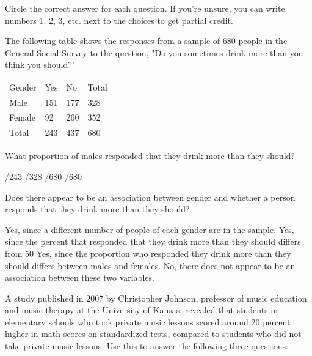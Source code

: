 \documentclass{article}
\begin{document}
	Circle the correct answer for each question.  If you're unsure, you can write numbers 1, 2, 3, etc. next to the choices to get partial credit.\\[.5cm]
	
	\begin{mcquestions}
		\begin{mcquestioninstruction}
			The following table shows the responses from a sample of 680 people in the General Social Survey to the question, "Do you sometimes drink more than you think you should?"\\
			
			\begin{tabular}{llll}
				Gender & Yes                     & No  & Total  \\
				Male   & 151                     & 177 & 328    \\
				Female & 92                      & 260 & 352    \\
				Total  & 243                     & 437 & 680   
			\end{tabular}
		\end{mcquestioninstruction}
		\question What proportion of males responded that they drink more than they should?
		\begin{mcanswerslist}
			/243
			/328
			/680
			/680
		\end{mcanswerslist}
		
		\question[follow] Does there appear to be an association between gender and whether a person responds that they drink more than they should?
		\begin{mcanswerslist}
			\answer Yes, since a different number of people of each gender are in the sample.
			\answer Yes, since the percent that responded that they drink more than they should differs from 50%
			\answer[correct] Yes, since the proportion who responded they drink more than they should differs between males and females.
			\answer No, there does not appear to be an association between these two variables.
		\end{mcanswerslist}
		
		\begin{mcquestioninstruction}
			A study published in 2007 by Christopher Johnson, professor of music education and music therapy at the University of Kansas, revealed that students in elementary schools who took private music lessons scored around 20 percent higher in math scores on standardized tests, compared to students who did not take private music lessons.  Use this to answer the following three questions:
		\end{mcquestioninstruction}
		

\end{mcquestions}
\end{document}
